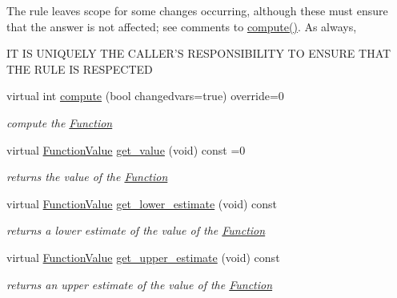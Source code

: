 \begin{Indent}
{The rule leaves scope for some changes occurring, although these must ensure that the answer is not affected; see comments to \mbox{\hyperlink{class_s_m_spp__di__unipi__it_1_1_function_a504d4e3e174c7a518cc66156a8a45ce5}{compute()}}. As always, \begin{DoxyVerb}          IT IS UNIQUELY THE CALLER'S RESPONSIBILITY
            TO ENSURE THAT THE RULE IS RESPECTED\end{DoxyVerb}
 }\begin{DoxyCompactItemize}
\item 
virtual int \mbox{\hyperlink{class_s_m_spp__di__unipi__it_1_1_function_a504d4e3e174c7a518cc66156a8a45ce5}{compute}} (bool changedvars=true) override=0
\begin{DoxyCompactList}\small\item\em compute the \mbox{\hyperlink{class_s_m_spp__di__unipi__it_1_1_function}{Function}} \end{DoxyCompactList}\item 
virtual \mbox{\hyperlink{class_s_m_spp__di__unipi__it_1_1_function_a9ad432406b609e28d340f73e9474bffe}{Function\+Value}} \mbox{\hyperlink{class_s_m_spp__di__unipi__it_1_1_function_a040b4850ae0a23a1c9ff79b497b6eaaf}{get\+\_\+value}} (void) const =0
\begin{DoxyCompactList}\small\item\em returns the value of the \mbox{\hyperlink{class_s_m_spp__di__unipi__it_1_1_function}{Function}} \end{DoxyCompactList}\item 
virtual \mbox{\hyperlink{class_s_m_spp__di__unipi__it_1_1_function_a9ad432406b609e28d340f73e9474bffe}{Function\+Value}} \mbox{\hyperlink{class_s_m_spp__di__unipi__it_1_1_function_aa55bc7e19736e8d640ad31ec134b94fb}{get\+\_\+lower\+\_\+estimate}} (void) const
\begin{DoxyCompactList}\small\item\em returns a lower estimate of the value of the \mbox{\hyperlink{class_s_m_spp__di__unipi__it_1_1_function}{Function}} \end{DoxyCompactList}\item 
virtual \mbox{\hyperlink{class_s_m_spp__di__unipi__it_1_1_function_a9ad432406b609e28d340f73e9474bffe}{Function\+Value}} \mbox{\hyperlink{class_s_m_spp__di__unipi__it_1_1_function_a018379619bc05b38bdab0e225016f98f}{get\+\_\+upper\+\_\+estimate}} (void) const
\begin{DoxyCompactList}\small\item\em returns an upper estimate of the value of the \mbox{\hyperlink{class_s_m_spp__di__unipi__it_1_1_function}{Function}} \end{DoxyCompactList}\item 

\end{DoxyCompactItemize}
\end{Indent}
